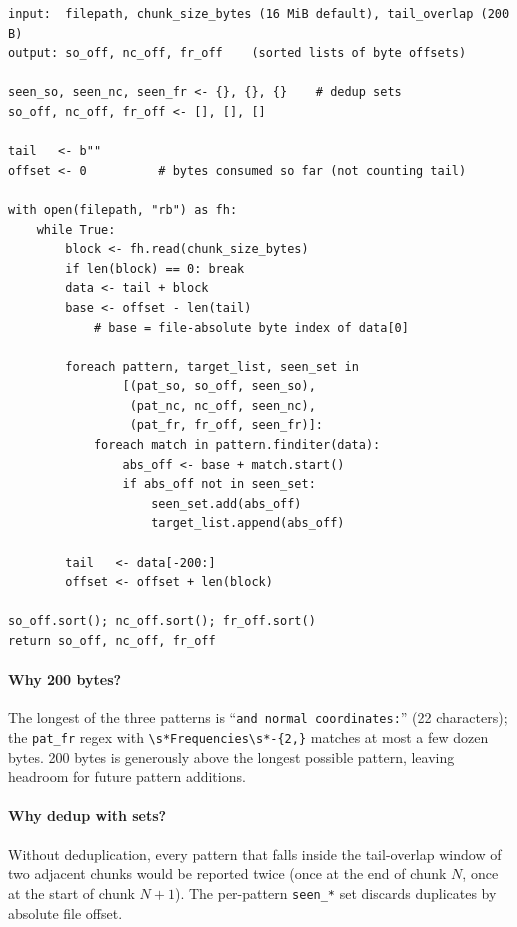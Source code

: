 \documentclass[10pt,a4paper,twoside]{article}
\newcommand{\fn}[1]{\texttt{#1}}
\begin{document}
\begin{lstlisting}[style=pseudo,
  caption={Streaming byte-offset scan of the Gaussian log with
           tail-overlap deduplication. Implementation:
           \protect\fn{logio.scan\_log}.}]
input:  filepath, chunk_size_bytes (16 MiB default), tail_overlap (200 B)
output: so_off, nc_off, fr_off    (sorted lists of byte offsets)

seen_so, seen_nc, seen_fr <- {}, {}, {}    # dedup sets
so_off, nc_off, fr_off <- [], [], []

tail   <- b""
offset <- 0          # bytes consumed so far (not counting tail)

with open(filepath, "rb") as fh:
    while True:
        block <- fh.read(chunk_size_bytes)
        if len(block) == 0: break
        data <- tail + block
        base <- offset - len(tail)
            # base = file-absolute byte index of data[0]

        foreach pattern, target_list, seen_set in
                [(pat_so, so_off, seen_so),
                 (pat_nc, nc_off, seen_nc),
                 (pat_fr, fr_off, seen_fr)]:
            foreach match in pattern.finditer(data):
                abs_off <- base + match.start()
                if abs_off not in seen_set:
                    seen_set.add(abs_off)
                    target_list.append(abs_off)

        tail   <- data[-200:]
        offset <- offset + len(block)

so_off.sort(); nc_off.sort(); fr_off.sort()
return so_off, nc_off, fr_off
\end{lstlisting}

\paragraph{Why 200 bytes?} The longest of the three patterns is
``\texttt{and normal coordinates:}'' (22 characters); the \texttt{pat\_fr}
regex with \texttt{\textbackslash{}s*Frequencies\textbackslash{}s*-\{2,\}}
matches at most a few dozen bytes. 200 bytes is generously above
the longest possible pattern, leaving headroom for future pattern
additions.

\paragraph{Why dedup with sets?} Without deduplication, every pattern
that falls inside the tail-overlap window of two adjacent chunks would
be reported twice (once at the end of chunk $N$, once at the start
of chunk $N+1$). The per-pattern \texttt{seen\_*} set discards
duplicates by absolute file offset.
\end{document}
